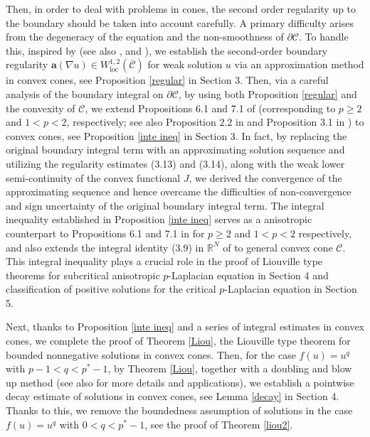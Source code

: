 \documentclass[12pt]{amsart}
\theoremstyle{definition}
\theoremstyle{remark}
\theoremstyle{conclusion}
\theoremstyle{conjecture}
\numberwithin{equation}{section}
\begin{document}
\smallskip

Then, in order to deal with problems in cones, the second order regularity up to the boundary should be taken into account carefully. A primary difficulty arises from the degeneracy of the equation and the non-smoothness of $\partial\mathcal{C}$. To handle this, inspired by \cite{CFR} (see also \cite{CL1}, \cite{DGL} and \cite{DGHP}), we establish the second-order boundary regularity $\mathbf{a}(\nabla u)\in W^{1,2}_{\text{loc}}(\overline{\mathcal{C}})$ for weak solution $u$ via an approximation method in convex cones, see Proposition \ref{regular} in Section 3. Then, via a careful analysis of the boundary integral on $\partial\mathcal{C}$, by using both Proposition \ref{regular} and the convexity of $\mathcal{C}$, we extend Propositions 6.1 and 7.1 of \cite{SZ} (corresponding to $p \geq 2$ and $1 < p < 2$, respectively; see also Proposition 2.2 in \cite{CMR} and Proposition 3.1 in \cite{CHN}) to convex cones, see Proposition \ref{inte ineq} in Section 3. In fact, by replacing the original boundary integral term with an approximating solution sequence and utilizing the regularity estimates (3.13) and (3.14), along with the weak lower semi-continuity of the convex functional $J$, we derived the convergence of the approximating sequence and hence overcame the difficulties of non-convergence and sign uncertainty of the original boundary integral term. The integral inequality established in Proposition \ref{inte ineq} serves as a anisotropic counterpart to Propositions 6.1 and 7.1 in \cite{SZ} for $p\geq2$ and $1<p<2$ respectively, and also extends the integral identity (3.9) in $\mathbb{R}^N$ of \cite{CHN} to general convex cone $\mathcal{C}$. This integral inequality plays a crucial role in the proof of Liouville type theorems for subcritical anisotropic $p$-Laplacian equation in Section 4 and classification of positive solutions for the critical $p$-Laplacian equation in Section 5.

\smallskip

Next, thanks to Proposition \ref{inte ineq} and a series of integral estimates in convex cones, we complete the proof of Theorem \ref{Liou}, the Liouville type theorem for bounded nonnegative solutions in convex cones. Then, for the case $f(u)=u^q$ with $p-1<q<p^*-1$, by Theorem \ref{Liou}, together with a doubling and blow up method (see also \cite{PQS} for more details and applications), we establish a pointwise decay estimate of solutions in convex cones, see Lemma \ref{decay} in Section 4. Thanks to this, we remove the boundedness assumption of solutions in the case $f(u)=u^q$ with $0<q<p^*-1$, see the proof of Theorem \ref{liou2}.
\end{document}
